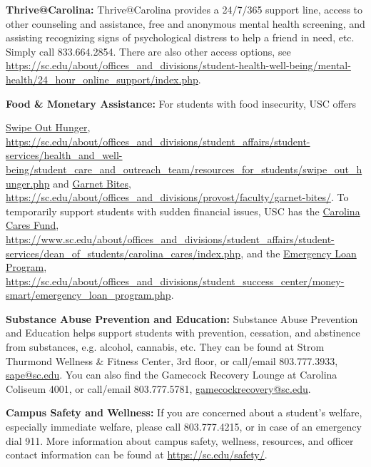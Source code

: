 \documentclass[11pt,letterpaper]{article}
\newcommand{\colortext}[1]{{\bfseries\color{scred}#1}}
\newcommand{\pspecial}{\par\vspace{0.50\baselineskip}}
\begin{document}
\colortext{Thrive@Carolina:} Thrive@Carolina provides a 24/7/365 support line, access to other counseling and assistance, free and anonymous mental health screening, and assisting recognizing signs of psychological distress to help a friend in need, etc. Simply call 833.664.2854. There are also other access options, see \url{https://sc.edu/about/offices\_and\_divisions/student-health-well-being/mental-health/24\_hour\_online\_support/index.php}. \pspecial

\colortext{Food \& Monetary Assistance:} For students with food insecurity, USC offers {\href{https://sc.edu/about/offices_and_divisions/student_affairs/student-services/health_and_well-being/student_care_and_outreach_team/resources_for_students/swipe_out_hunger.php}{Swipe Out Hunger}, \url{https://sc.edu/about/offices\_and\_divisions/student\_affairs/student-services/health\_and\_well-being/student\_care\_and\_outreach\_team/resources\_for\_students/swipe\_out\_hunger.php} and \href{https://sc.edu/about/offices\_and\_divisions/provost/faculty/garnet-bites/}{Garnet Bites}, \url{https://sc.edu/about/offices\_and\_divisions/provost/faculty/garnet-bites/}. To temporarily support students with sudden financial issues, USC has the \href{https://www.sc.edu/about/offices_and_divisions/student\_affairs/student-services/dean\_of\_students/carolina\_cares/index.php}{Carolina Cares Fund}, \url{https://www.sc.edu/about/offices_and_divisions/student\_affairs/student-services/dean\_of\_students/carolina\_cares/index.php}, and the \href{https://sc.edu/about/offices\_and\_divisions/student\_success\_center/money-smart/emergency\_loan\_program.php}{Emergency Loan Program}, \url{https://sc.edu/about/offices\_and\_divisions/student\_success\_center/money-smart/emergency\_loan\_program.php}. \pspecial

\colortext{Substance Abuse Prevention and Education:} Substance Abuse Prevention and Education helps support students with prevention, cessation, and abstinence from substances, e.g. alcohol, cannabis, etc. They can be found at Strom Thurmond Wellness \& Fitness Center, 3rd floor, or call/email 803.777.3933, \href{mailto:sape@sc.edu}{sape@sc.edu}. You can also find the Gamecock Recovery Lounge at Carolina Coliseum 4001, or call/email 803.777.5781, \href{mailto:gamecockrecovery@sc.edu}{gamecockrecovery@sc.edu}. \pspecial

\colortext{Campus Safety and Wellness:} If you are concerned about a student's welfare, especially immediate welfare, please call 803.777.4215, or in case of an emergency dial 911. More information about campus safety, wellness, resources, and officer contact information can be found at \url{https://sc.edu/safety/}. \pspecial

}
\end{document}
